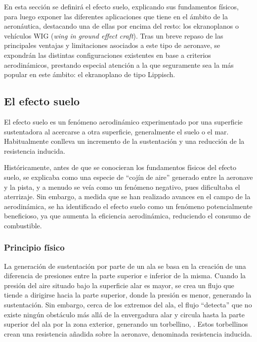 En esta sección se definirá el efecto suelo, explicando sus fundamentos físicos, para luego exponer las diferentes aplicaciones que tiene en el ámbito de la aeronáutica, destacando una de ellas por encima del resto: los ekranoplanos o vehículos WIG (\emph{wing in ground effect craft}). Tras un breve repaso de las principales ventajas y limitaciones asociados a este tipo de aeronave, se expondrán las distintas configuraciones existentes en base a criterios aerodinámicos, prestando especial atención a la que seguramente sea la más popular en este ámbito: el ekranoplano de tipo Lippisch.


\subsection{El efecto suelo}
\label{sec:wig:ge}

El efecto suelo es un fenómeno aerodinámico experimentado por una superficie sustentadora al acercarse a otra superficie, generalmente el suelo o el mar. Habitualmente conlleva un incremento de la sustentación y una reducción de la resistencia inducida.

Históricamente, antes de que se conocieran los fundamentos físicos del efecto suelo, se explicaba como una especie de “cojín de aire” generado entre la aeronave y la pista, y a menudo se veía como un fenómeno negativo, pues dificultaba el aterrizaje. Sin embargo, a medida que se han realizado avances en el campo de la aerodinámica, se ha identificado el efecto suelo como un fenómeno potencialmente beneficioso, ya que aumenta la eficiencia aerodinámica, reduciendo el consumo de combustible.


\subsubsection{Principio físico}
\label{sec:wig:ge:principle}

La generación de sustentación por parte de un ala se basa en la creación de una diferencia de presiones entre la parte superior e inferior de la misma. Cuando la presión del aire situado bajo la superficie alar es mayor, se crea un flujo que tiende a dirigirse hacia la parte superior, donde la presión es menor, generando la sustentación. Sin embargo, cerca de los extremos del ala, el flujo “detecta” que no existe ningún obstáculo más allá de la envergadura alar y circula hasta la parte superior del ala por la zona exterior, generando un torbellino, . Estos torbellinos crean una resistencia añadida sobre la aeronave, denominada resistencia inducida.

